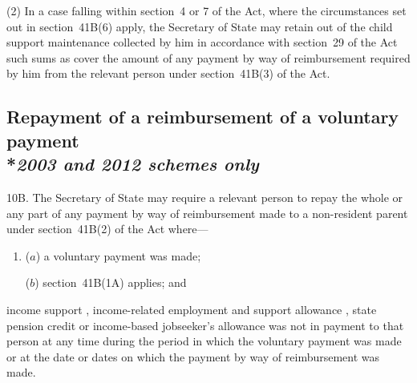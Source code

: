 \documentclass[12pt,a4paper]{article}
\begin{document}
(2) In a case falling within section~4 or 7 of the Act, where the circumstances set out in section~41B(6) apply, the Secretary of State may retain out of the child support maintenance collected by him in accordance with section~29 of the Act such sums as cover the amount of any payment by way of reimbursement required by him from the relevant person under section~41B(3) of the Act.


\subsection[10B. Repayment of a reimbursement of a voluntary payment --- \emph{2003 and 2012 schemes only}]{Repayment of a reimbursement of a voluntary payment\\*\emph{2003 and 2012 schemes only}}

10B.  The Secretary of State may require a relevant person to repay the whole or any part of any payment by way of reimbursement made to a non-resident parent under section~41B(2) of the Act where—
\begin{enumerate}\item[]
($a$) a voluntary payment was made;

($b$) section~41B(1A) applies; and
\end{enumerate}
income support%
, income-related employment and support allowance%
, state pension credit  %
or income-based jobseeker’s allowance was not in payment to that person at any time during the period in which the voluntary payment was made or at the date or dates on which the payment by way of reimbursement was made.
\end{document}
